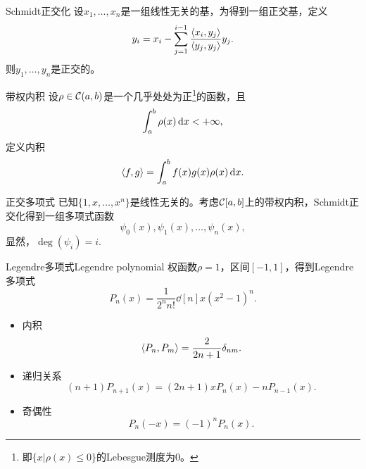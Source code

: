 \begin{theorem}
    {Schmidt正交化}{}
    设$x_1,\ldots,x_n$是一组线性无关的基，为得到一组正交基，定义
    \begin{equation}
        y_i=x_i-\sum_{j=1}^{i-1}\frac{\left\langle x_i,y_j\right\rangle}{\left\langle y_j,y_j\right\rangle}y_j.
    \end{equation}
    则$y_1,\ldots,y_n$是正交的。
\end{theorem}

\begin{definition}
    {带权内积}{}
    设$\rho\in\mathcal C(a,b)$是一个几乎处处为正\footnote{即$\{x|\rho(x)\leq 0\}$的Lebesgue测度为0。}的函数，且
    \[
        \int_a^b\rho(x)\mathop{}\!\mathrm{d} x<+\infty,
    \]
    定义内积
    \begin{equation}
        \left\langle f,g\right\rangle=\int_a^bf(x)g(x)\rho(x)\mathop{}\!\mathrm{d} x.
    \end{equation}
\end{definition}

\begin{definition}
    {正交多项式}{}
    已知$\{1,x,\ldots,x^n\}$是线性无关的。考虑$\mathcal C[a,b]$上的带权内积，Schmidt正交化得到一组多项式函数
    \[
        \psi_0(x),\psi_1(x),\ldots,\psi_n(x),
    \]
    显然，$\deg(\psi_i)=i.$
\end{definition}

\begin{example}
    {Legendre多项式}{Legendre polynomial}
    权函数$\rho=1$，区间$[-1,1]$，得到Legendre多项式
    \begin{equation}
        P_n(x)=\frac1{2^nn!}\dd[n]x(x^2-1)^n.
    \end{equation}
    \begin{itemize}
        \item 内积 
        \begin{equation}
            \left\langle P_n,P_m\right\rangle=\frac2{2n+1}\delta_{nm}.
        \end{equation}
        \item 递归关系
        \begin{equation}
            (n+1)P_{n+1}(x)=(2n+1)xP_n(x)-nP_{n-1}(x).
        \end{equation}
        \item 奇偶性
        \begin{equation}
            P_n(-x)=(-1)^nP_n(x).
        \end{equation}
    \end{itemize}
\end{example}

